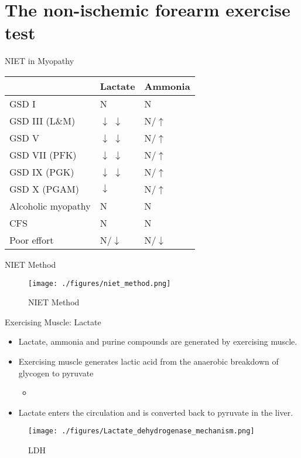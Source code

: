 \documentclass[presentation, smaller]{beamer}
\begin{document}
\section{The non-ischemic forearm exercise test}
\label{sec:orgd42175b}
\begin{frame}[label={sec:org5d4debd}]{NIET in Myopathy}
\begin{center}
\begin{tabular}{lll}
 & Lactate & Ammonia\\
\hline
GSD I & N & N\\
GSD III (L\&M) & \(\downarrow\) \(\downarrow\) & N/\(\uparrow\)\\
GSD V & \(\downarrow\) \(\downarrow\) & N/\(\uparrow\)\\
\alert{GSD VII (PFK)} & \(\downarrow\) \(\downarrow\) & N/\(\uparrow\)\\
\alert{GSD IX (PGK)} & \(\downarrow\) \(\downarrow\) & N/\(\uparrow\)\\
\alert{GSD X (PGAM)} & \(\downarrow\) & N/\(\uparrow\)\\
Alcoholic myopathy & N & N\\
CFS & N & N\\
Poor effort & N/\(\downarrow\) & N/\(\downarrow\)\\
\end{tabular}
\end{center}
\end{frame}

\begin{frame}[label={sec:orgfa2fc4d}]{NIET Method}
\begin{figure}[htbp]
\centering
\texttt{[image: ./figures/niet\_method.png]}
\caption{\label{fig:org5e155f1}
NIET Method}
\end{figure}
\end{frame}


\begin{frame}[label={sec:orgf2c3a80}]{Exercising Muscle: Lactate}
\begin{itemize}
\item Lactate, ammonia and purine compounds are generated by exercising muscle.
\item Exercising muscle generates lactic acid from the anaerobic breakdown
of glycogen to pyruvate
\begin{itemize}
\item {}
\end{itemize}
\item Lactate enters the circulation and is converted back to pyruvate in the liver.
\end{itemize}

\begin{figure}[htbp]
\centering
\texttt{[image: ./figures/Lactate\_dehydrogenase\_mechanism.png]}
\caption{\label{fig:org21f9a7c}
LDH}
\end{figure}
\end{frame}
\end{document}
